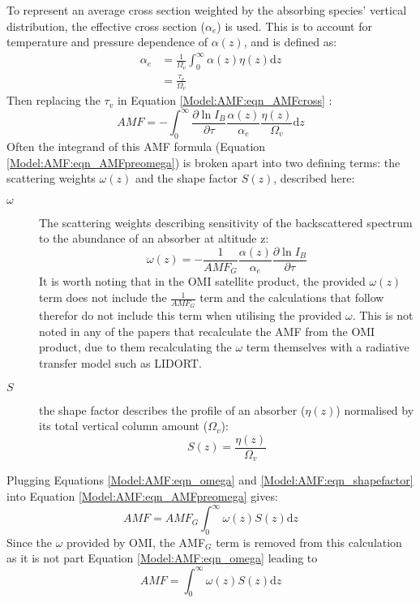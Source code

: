   To represent an average cross section weighted by the absorbing species' vertical distribution, the effective cross section ($\alpha_e$) is used.
  This is to account for temperature and pressure dependence of $\alpha(z)$, and is defined as:
  \begin{align*}
    \alpha_e &= \frac{1}{\Omega_v} \int_0^\infty \alpha(z) \eta(z) \mathrm{d}z \\
     &= \frac{\tau_v}{\Omega_v}
  \end{align*}
  Then replacing the $\tau_v$ in Equation \ref{Model:AMF:eqn_AMFcross} :
  \begin{equation} \label{Model:AMF:eqn_AMFpreomega}
    AMF=-\int_0^\infty{ \frac{\partial \ln{I_B}}{\partial \tau} \frac{\alpha(z)}{\alpha_e} \frac{\eta(z)}{\Omega_v} \mathrm{d}z }
  \end{equation}
  Often the integrand of this AMF formula (Equation \ref{Model:AMF:eqn_AMFpreomega}) is broken apart into two defining terms: the scattering weights $\omega(z)$ and the shape factor $S(z)$, described here:
  \begin{description}
    \item[$\omega$] The scattering weights describing sensitivity of the backscattered spectrum to the abundance of an absorber at altitude z:
    \begin{equation} \label{Model:AMF:eqn_omega}
      \omega(z) = -\frac{1}{AMF_G} \frac{\alpha(z)}{\alpha_e} \frac{\partial \ln{I_B}}{\partial \tau}
    \end{equation}
    It is worth noting that in the OMI satellite product, the provided $\omega(z)$ term does not include the $\frac{1}{AMF_G}$ term and the calculations that follow therefor do not include this term when utilising the provided $\omega$.
    This is not noted in any of the papers that recalculate the AMF from the OMI product, due to them recalculating the $\omega$ term themselves with a radiative transfer model such as LIDORT.
    \item[$S$] the shape factor describes the profile of an absorber ($\eta(z)$) normalised by its total vertical column amount ($\Omega_v$):
    \begin{equation} \label{Model:AMF:eqn_shapefactor}
      S(z) = \frac{\eta(z)}{\Omega_v}
    \end{equation}
  \end{description}
  
  Plugging Equations \ref{Model:AMF:eqn_omega} and \ref{Model:AMF:eqn_shapefactor} into Equation \ref{Model:AMF:eqn_AMFpreomega} gives:
  \begin{equation} \label{Model:AMF:eqn_AMF_amfgintwSdz}
    AMF = AMF_G\int_0^\infty{ \omega(z) S(z) \mathrm{d}z}
  \end{equation}
  Since  the $\omega$ provided by OMI, the AMF$_G$ term is removed from this calculation as it is not part Equation \ref{Model:AMF:eqn_omega} leading to 
  \begin{equation} \label{Model:AMF:eqn_AMF_intwSdz}
    AMF = \int_0^\infty{ \omega(z) S(z) \mathrm{d}z}
  \end{equation}
  
